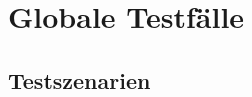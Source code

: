 \section{Globale Testfälle}

\renewcommand{\arraystretch}{1.24}  %

\newenvironment{usecase*}[2]{
	\needspace{#1\baselineskip} %
	\subsubsection*{#2}  
	\hspace{1pt}\vspace{-2\baselineskip}  %
	\begin{longtable}{|>{\hspace{0pt}}p{.18\linewidth}|p{.34\linewidth}|p{.44\linewidth}|}   %
		\hhline{|=|=|=|}
		\textbf{Stand} & \textbf{Aktion} & \textbf{Reaktion} \\
		\hline 
		\endfirsthead
		
		\hline
		\textbf{Stand} & \textbf{Aktion} & \textbf{Reaktion} \\
		\endhead
		
		\hhline{|=|=|=|}
		\endlastfoot
}{
	\end{longtable}
}

\newenvironment{usecase}[1]{
	\begin{usecase*}{5}{#1}
}{
	\end{usecase*}
}

\newenvironment{tblitemize}{
	\begin{itemize}[nosep,leftmargin=12pt]
}{
	\end{itemize}\hspace{0pt}\vspace{-\baselineskip}
}




\subsection{Testszenarien}






